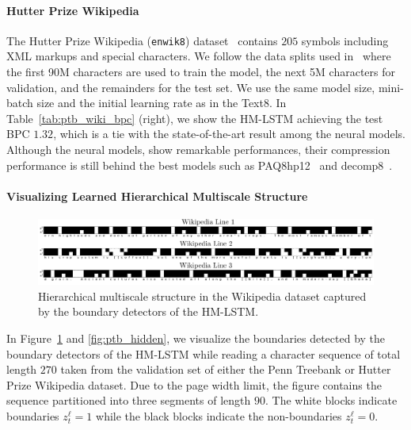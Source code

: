 \documentclass{article} %
\begin{document}
\paragraph{Hutter Prize Wikipedia} 
The Hutter Prize Wikipedia (\texttt{enwik8}) dataset~\citep{Hutter2012} contains $205$ symbols 
including XML markups and special characters.
We follow the data splits used in~\citet{graves2013generating}
where the first 90M characters are used to train the model, 
the next 5M characters for validation, and the remainders for the test set. 
We use the same model size, mini-batch size and the initial learning rate as in the Text8.
In Table~\ref{tab:ptb_wiki_bpc} (right), we show the HM-LSTM achieving the test BPC $1.32$, which is a tie
with the state-of-the-art result among the neural models.
Although the neural models, show remarkable performances, their compression performance is
still behind the best models such as PAQ8hp12~\citep{mahoney2005adaptive} and decomp8~\citep{mahoney2009large}.

\paragraph{Visualizing Learned Hierarchical Multiscale Structure}
\begin{figure}[t]
    \vspace*{-0.3cm}
    \hspace*{-1.5cm}
    \begin{minipage}{1.1\columnwidth}
    	\centering
     	\includegraphics[width=1.1\columnwidth]{wiki_boundary.pdf}
    \end{minipage}
    \caption{Hierarchical multiscale structure in the Wikipedia dataset captured by the boundary detectors of the HM-LSTM.}
     \label{fig:wiki_bound} 
\end{figure}
In Figure~\ref{fig:wiki_bound} and \ref{fig:ptb_hidden}, we visualize the boundaries detected by the boundary detectors of the HM-LSTM
while reading a character sequence of total length $270$ taken from the validation set of either the Penn Treebank or Hutter Prize Wikipedia dataset.
Due to the page width limit, the figure contains the sequence partitioned into three segments of length $90$. 
The white blocks indicate boundaries $z^{\ell}_t=1$ while the black blocks indicate the non-boundaries $z^{\ell}_t=0$.
\end{document}
